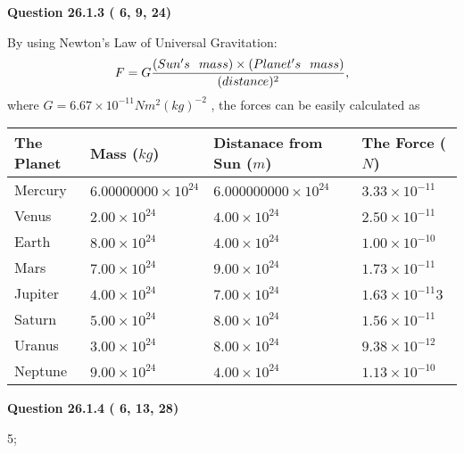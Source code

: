 \documentclass[12pt]{article}
\begin{document}
  
  
{\textbf{\large{Question
26.1.3 
 (          6,          9,         24)
}}}

By using Newton's Law of Universal Gravitation:
\[
F=G \frac{(Sun's \hspace{0.1in} mass) \times (Planet's \hspace{0.1in} mass)} { (distance)^2},
\]
where
$ G= %
6.67 \times 10^{-11} N m^{2}(kg)^{-2}$ , the forces can be easily calculated as
 
\vspace{0.2in}
 
 
\begin{tabular}{|l|l|l|l|}
\hline
The Planet & Mass ($kg$) & Distanace from Sun ($m$) & The Force ($N$)\\
\hline
Mercury  &
           $ %
6.00000000 \times 10^{24}  $   &
             $ %
6.000000000 \times 10^{24}$    & $ %
3.33 \times 10^{-11} $
\\  \hline
Venus    &
           $  %
2.00 \times 10^{24}  $     &
             $ %
4.00 \times 10^{24} $    & $ %
2.50 \times 10^{-11} $
\\  \hline
Earth    &
           $  %
8.00 \times 10^{24}$     &
             $ %
4.00 \times 10^{24} $    & $ %
1.00 \times 10^{-10} $
\\   \hline
Mars     &
           $  %
7.00 \times 10^{24} $     &
             $ %
9.00 \times 10^{24}$    & $ %
1.73 \times 10^{-11} $
\\   \hline
Jupiter  &
           $  %
4.00 \times 10^{24}  $    &
             $ %
7.00 \times 10^{24} $    & $ %
1.63 \times 10^{-11}3 $
\\  \hline
Saturn   &
           $  %
5.00 \times 10^{24}   $    &
             $ %
8.00 \times 10^{24}  $    & $ %
1.56 \times 10^{-11} $
\\  \hline
Uranus   &
           $  %
3.00 \times 10^{24} $    &
             $ %
8.00 \times 10^{24}$    & $ %
9.38 \times 10^{-12} $
\\  \hline
Neptune  &
           $  %
9.00 \times 10^{24}  $    &
             $ %
4.00 \times 10^{24} $    & $ %
1.13 \times 10^{-10} $
\\  \hline
 
\end{tabular}
 
 
  
  
{\textbf{\large{Question
26.1.4 
 (          6,         13,         28)
}}}

5;
 
\end{document}
